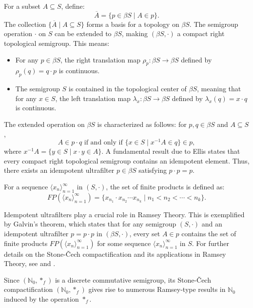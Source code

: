 \documentclass[12pt]{amsart}
\theoremstyle{plain}
\theoremstyle{definition}
\theoremstyle{remark}
\numberwithin{equation}{section}
\newcommand{\af}{\ast_f}
\begin{document}
For a subset \(A \subseteq S\), define:
\[
\overline{A} = \{p \in \beta S \mid A \in p\}.
\]
The collection \(\{\overline{A} \mid A \subseteq S\}\) forms a basis for a topology on \(\beta S\). The semigroup operation \(\cdot\) on \(S\) can be extended to \(\beta S\), making \((\beta S, \cdot)\) a compact right topological semigroup. This means:
\begin{itemize}
    \item For any \(p \in \beta S\), the right translation map \(\rho_p: \beta S \to \beta S\) defined by \(\rho_p(q) = q \cdot p\) is continuous.
    \item The semigroup \(S\) is contained in the topological center of \(\beta S\), meaning that for any \(x \in S\), the left translation map \(\lambda_x: \beta S \to \beta S\) defined by \(\lambda_x(q) = x \cdot q\) is continuous.
\end{itemize}

The extended operation on \(\beta S\) is characterized as follows: for \(p, q \in \beta S\) and \(A \subseteq S\),
\[
A \in p \cdot q \mbox{ if and only if }  \{x \in S \mid x^{-1} A \in q\} \in p,
\]
where \(x^{-1} A = \{y \in S \mid x \cdot y \in A\}\). A fundamental result due to Ellis states that every compact right topological semigroup contains an idempotent element. Thus, there exists an idempotent ultrafilter \(p \in \beta S\) satisfying \(p \cdot p = p\).

For a sequence \(\langle x_n \rangle_{n=1}^\infty\) in \((S, \cdot)\), the set of finite products is defined as:
\[
FP(\langle x_n \rangle_{n=1}^\infty) = \{x_{n_1} \cdot x_{n_2} \cdots x_{n_k} \mid n_1 < n_2 < \cdots < n_k\}.
\]

Idempotent ultrafilters play a crucial role in Ramsey Theory. This is exemplified by Galvin's theorem, which states that for any semigroup \((S, \cdot)\) and an idempotent ultrafilter \(p = p \cdot p\) in \((\beta S, \cdot)\), every set \(A \in p\) contains the set of finite products \(FP(\langle x_n \rangle_{n=1}^\infty)\) for some sequence \(\langle x_n \rangle_{n=1}^\infty\) in \(S\). For further details on the Stone-Čech compactification and its applications in Ramsey Theory, see \cite{HS12} and \cite{Tod10}.

Since \((\mathbb{N}_0, \af)\) is a discrete commutative semigroup, its Stone-Čech compactification \((\mathbb{N}_0, \af)\) gives rise to numerous Ramsey-type results in \(\mathbb{N}_0\) induced by the operation \(\af\).
\end{document}
